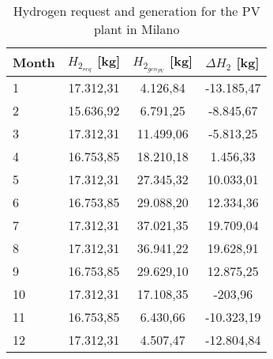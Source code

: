 \begin{table}[hp]
\centering
\begin{tabular}{|l|c|c|c|}
\hline
\rowcolor{bluepoli!40}\textbf{Month} & \multicolumn{1}{l|}{\textbf{$H_{2_{req}}$   [kg]}} & \multicolumn{1}{l|}{\textbf{$H_{2_{gen_{PV}}}$ [kg]}} & \multicolumn{1}{l|}{\textbf{$\Delta H_2$ [kg]}} \\ \hline
1              & 17.312,31              & 4.126,84              & -13.185,47                                     \\ \hline
2              & 15.636,92              & 6.791,25              & -8.845,67                                      \\ \hline
3              & 17.312,31              & 11.499,06             & -5.813,25                                      \\ \hline
4              & 16.753,85              & 18.210,18             & 1.456,33                                       \\ \hline
5              & 17.312,31              & 27.345,32             & 10.033,01                                      \\ \hline
6              & 16.753,85              & 29.088,20             & 12.334,36                                      \\ \hline
7              & 17.312,31              & 37.021,35             & 19.709,04                                      \\ \hline
8              & 17.312,31              & 36.941,22             & 19.628,91                                      \\ \hline
9              & 16.753,85              & 29.629,10             & 12.875,25                                      \\ \hline
10             & 17.312,31              & 17.108,35             & -203,96                                        \\ \hline
11             & 16.753,85              & 6.430,66              & -10.323,19                                     \\ \hline
12             & 17.312,31              & 4.507,47              & -12.804,84                                     \\ \hline
\end{tabular}
\caption{Hydrogen request and generation for the PV plant in Milano}
\label{tab:hydrogenmilan}
\end{table}